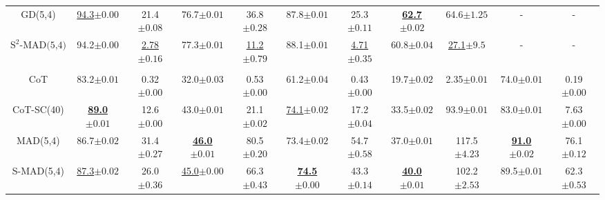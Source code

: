 \begin{table*}[t]
{\begin{tabular}{ccccccccccc}
    GD(5,4)                  & \underline{94.3}\scriptsize{$\pm 0.00$} & 21.4\scriptsize{$\pm 0.08$}           & 76.7\scriptsize{$\pm 0.01$} & 36.8\scriptsize{$\pm 0.28$}         & 87.8\scriptsize{$\pm 0.01$} & 25.3\scriptsize{$\pm 0.11$}                & \underline{\textbf{62.7}}\scriptsize{$\pm 0.02$} & 64.6\scriptsize{$\pm 1.25$}
    & - & - \\
    \({\text{S}^2\text{-MAD(5,4)}}\)                  & 94.2\scriptsize{$\pm 0.00$} & \underline{2.78}\scriptsize{$\pm 0.16$}          & 77.3\scriptsize{$\pm 0.01$} & \underline{11.2}\scriptsize{$\pm 0.79$}         & 88.1\scriptsize{$\pm 0.01$} & \underline{4.71}\scriptsize{$\pm 0.35$}                & 60.8\scriptsize{$\pm 0.04$} & \underline{27.1}\scriptsize{$\pm 9.5$}         & - & -           \\
    \midrule
    \rowcolor{lightgray}
    \rowcolor{Gray}
    \multicolumn{11}{c}{\texttt{Llama-3.1-8B-Instruct}} 
    \\
    \midrule
    CoT                      & 83.2\scriptsize{$\pm 0.01$} & 0.32\scriptsize{$\pm 0.00$}           & 32.0\scriptsize{$\pm 0.03$} & 0.53\scriptsize{$\pm 0.00$}         & 61.2\scriptsize{$\pm 0.04$} & 0.43\scriptsize{$\pm 0.00$}         & 19.7\scriptsize{$\pm 0.02$}                & 2.35\scriptsize{$\pm 0.01$}         & 74.0\scriptsize{$\pm 0.01$} & 0.19\scriptsize{$\pm 0.00$}          \\
    CoT-SC(40)               & \underline{\textbf{89.0}}\scriptsize{$\pm 0.01$} & 12.6\scriptsize{$\pm 0.00$}          & 43.0\scriptsize{$\pm 0.01$}  & 21.1\scriptsize{$\pm 0.02$}         & \underline{74.1}\scriptsize{$\pm 0.02$}     & 17.2\scriptsize{$\pm 0.04$}                & 33.5\scriptsize{$\pm 0.02$} & 93.9\scriptsize{$\pm 0.01$}         & 83.0\scriptsize{$\pm 0.01$} & 7.63\scriptsize{$\pm 0.00$}           \\
    MAD(5,4)                 & 86.7\scriptsize{$\pm 0.02$} & 31.4\scriptsize{$\pm 0.27$}          & \underline{\textbf{46.0}}\scriptsize{$\pm 0.01$} & 80.5\scriptsize{$\pm 0.20$}        & 73.4\scriptsize{$\pm 0.02$} & 54.7\scriptsize{$\pm 0.58$}                & 37.0\scriptsize{$\pm 0.01$} & 117.5\scriptsize{$\pm 4.23$}         & \underline{\textbf{91.0}}\scriptsize{$\pm 0.02$} & 76.1\scriptsize{$\pm 0.12$}           \\ 
    S-MAD(5,4)                 & \underline{87.3}\scriptsize{$\pm 0.02$} & 26.0\scriptsize{$\pm 0.36$}          & \underline{45.0}\scriptsize{$\pm 0.00$}  & 66.3\scriptsize{$\pm 0.43$}        & \underline{\textbf{74.5}}\scriptsize{$\pm 0.00$} & 43.3\scriptsize{$\pm 0.14$}                 & \underline{\textbf{40.0}}\scriptsize{$\pm 0.01$} & 102.2\scriptsize{$\pm 2.53$}         &  89.5\scriptsize{$\pm 0.01$} & 62.3\scriptsize{$\pm 0.53$}           \\ 

\end{tabular}}
\end{table*}
